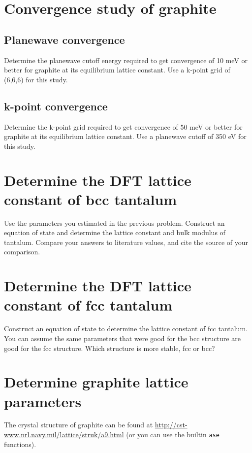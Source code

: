 \documentclass[11pt]{article}
\begin{document}
\section{Convergence study of graphite}
\label{sec-2}
\subsection{Planewave convergence}
\label{sec-2-1}

Determine the planewave cutoff energy required to get convergence of 10 meV or better for graphite at its equilibrium lattice constant. Use a k-point grid of (6,6,6) for this study.
\subsection{k-point convergence}
\label{sec-2-2}

Determine the k-point grid required to get convergence of 50 meV or better for graphite at its equilibrium lattice constant. Use a planewave cutoff of 350 eV for this study.
\section{Determine the DFT lattice constant of bcc tantalum}
\label{sec-3}

Use the parameters you estimated in the previous problem. Construct an equation of state and determine the lattice constant and bulk modulus of tantalum. Compare your answers to literature values, and cite the source of your comparison.
\section{Determine the DFT lattice constant of fcc tantalum}
\label{sec-4}

Construct an equation of state to determine the lattice constant of fcc tantalum. You can assume the same parameters that were good for the bcc structure are good for the fcc structure. Which structure is more stable, fcc or bcc?
\section{Determine graphite lattice parameters}
\label{sec-5}

The crystal structure of graphite can be found at \href{http://cst-www.nrl.navy.mil/lattice/struk/a9.html}{http://cst-www.nrl.navy.mil/lattice/struk/a9.html} (or you can use the builtin \texttt{ase} functions).
\end{document}
